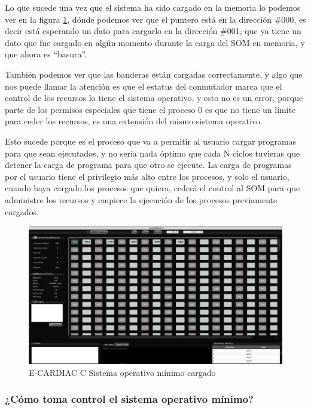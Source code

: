\documentclass[letterpaper,12pt,oneside]{book}
\begin{document}
		Lo que sucede una vez que el sistema ha sido cargado en la memoria lo podemos ver en la figura \ref{fig:eccSOMcargado}, dónde podemos ver que el
		puntero está en la dirección \#000, es decir está esperando un dato para cargarlo en la dirección \#001, que ya tiene un dato que fue cargado
		en algún momento durante la carga del SOM en memoria, y que ahora es ``basura''.
  
        También podemos ver que las banderas están cargadas correctamente, y algo que nos puede llamar la atención
		es que el estatus del conmutador marca que el control de los recursos lo tiene el sistema operativo, y esto no es un error, porque parte de los permisos especiales
		que tiene el proceso 0 es que no tiene un límite para ceder los recursos, es una extensión del mismo sistema operativo. 
  
        Esto sucede porque es el proceso que va a permitir
		al usuario cargar programas para que sean ejecutados, y no sería nada óptimo que cada N ciclos tuvieras que detener la carga de programa para que otro se ejecute.
		La carga de programas por el usuario tiene el privilegio más alto entre los procesos, y solo el usuario, cuando haya cargado los procesos
		que quiera, cederá el control al SOM para que administre los recursos y empiece la ejecución de los procesos previamente cargados.
		
		\begin{figure}[h]		
			\centering
			\includegraphics[scale=0.25]{media/CARDIACC/ECARDIACC_socargado.png}
			\caption{E-CARDIAC C Sistema operativo mínimo cargado}
			\label{fig:eccSOMcargado}
		\end{figure}
		
		
		\subsubsection{¿Cómo toma control el sistema operativo mínimo?}
		
\end{document}
